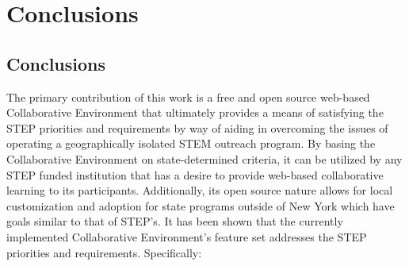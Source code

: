 \chapter{Conclusions}
\label{chap:conclusion}

\section{Conclusions}
The primary contribution of this work is a free and open source web-based Collaborative Environment that ultimately provides a means of satisfying the STEP priorities and requirements by way of aiding in overcoming the issues of operating a geographically isolated STEM outreach program. By basing the Collaborative Environment on state-determined criteria, it can be utilized by any STEP funded institution that has a desire to provide web-based collaborative learning to its participants. Additionally, its open source nature allows for local customization and adoption for state programs outside of New York which have goals similar to that of STEP's. It has been shown that the currently implemented Collaborative Environment's feature set addresses the STEP priorities and requirements. Specifically:

